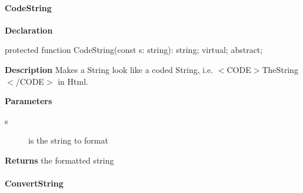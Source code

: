 \documentclass{report}
\newif\ifpdf
\begin{document}
\paragraph*{CodeString}\hspace*{\fill}

\label{PasDoc_Gen.TDocGenerator-CodeString}
\begin{list}{}{
\setlength{\itemindent}{0cm}
\setlength{\listparindent}{0cm}
\setlength{\leftmargin}{\evensidemargin}
\addtolength{\leftmargin}{\tmplength}
\settowidth{\labelsep}{X}
\addtolength{\leftmargin}{\labelsep}
\setlength{\labelwidth}{\tmplength}
}
\item[\textbf{Declaration}\hfill]
\ifpdf
\begin{flushleft}
\fi
\begin{ttfamily}
protected function CodeString(const s: string): string; virtual; abstract;\end{ttfamily}

\ifpdf
\end{flushleft}
\fi

\par
\item[\textbf{Description}]
Makes a String look like a coded String, i.e. {$<$}CODE{$>$}TheString{$<$}/CODE{$>$} in Html.\hfill\vspace*{1ex}

  \par
\item[\textbf{Parameters}]
\begin{description}
\item[s] is the string to format
\end{description}
\item[\textbf{Returns}]the formatted string


\end{list}
\paragraph*{ConvertString}\hspace*{\fill}
\end{document}
